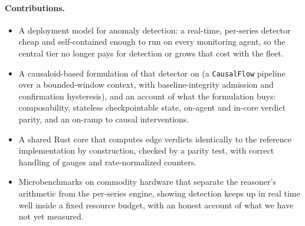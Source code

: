 \paragraph{Contributions.}
\begin{itemize}
  \item A deployment model for anomaly detection: a real-time, per-series detector
        cheap and self-contained enough to run on every monitoring agent, so the
        central tier no longer pays for detection or grows that cost with the fleet.
  \item A causaloid-based formulation of that detector on \dc{} (a
        \texttt{CausalFlow} pipeline over a bounded-window context, with
        baseline-integrity admission and confirmation hysteresis), and an account of
        what the formulation buys: composability, stateless checkpointable state,
        on-agent and in-core verdict parity, and an on-ramp to causal interventions.
  \item A shared Rust core that computes edge verdicts identically to the reference
        implementation by construction, checked by a parity test, with correct
        handling of gauges and rate-normalized counters.
  \item Microbenchmarks on commodity hardware that separate the reasoner's
        arithmetic from the per-series engine, showing detection keeps up in real
        time well inside a fixed resource budget, with an honest account of what we
        have not yet measured.
\end{itemize}
